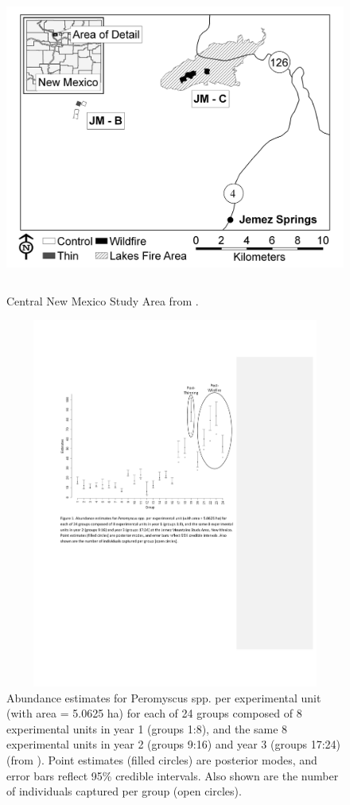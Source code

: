 \begin{figure}[ht]
\begin{center}
\includegraphics[height=4in,width=5.2in]{Ch14-Multisession/figs/converse_NM_Overview_4.jpg}
\end{center}
\caption{
Central New Mexico Study Area from \citet{converse_etal:2006jwm}.
}
\label{fig.studyarea}
\end{figure}



\begin{figure}[ht]
\begin{center}
\includegraphics[height=4.8in,width=6.5in]{Ch14-Multisession/figs/figure_V2.pdf}
\end{center}
\caption{
Abundance estimates for Peromyscus spp. per experimental unit
(with area = 5.0625 ha) for each of 24 groups composed of 8
experimental units in year 1 (groups 1:8), and the same 8
experimental units in year 2 (groups 9:16) and year 3 (groups 17:24)
(from \citet{royle_converse:2013}).
 Point estimates
(filled circles) are posterior modes, and error bars reflect 95\%
credible intervals. Also shown are the number of individuals
captured per group (open circles).  }
\label{fig.fig1}
\end{figure}


